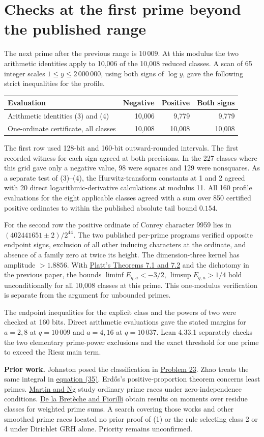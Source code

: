 \documentclass[11pt,a4paper]{article}
\newcommand{\head}[1]{\section*{\color{ink}#1}}
\begin{document}
\newpage
\head{Checks at the first prime beyond the published range}
The next prime after the previous range is \(10\,009\). At this modulus the two
arithmetic identities apply to 10,006 of the 10,008 reduced classes. A scan of
65 integer scales \(1\le y\le2\,000\,000\), using both signs of \(\log y\),
gave the following strict inequalities for the profile.
\begin{center}
\begin{tabular}{lrrr}
\hline
Evaluation & Negative & Positive & Both signs\\
\hline
Arithmetic identities (3) and (4) & 10,006 & 9,779 & 9,779\\
One-ordinate certificate, all classes & 10,008 & 10,008 & 10,008\\
\hline
\end{tabular}
\end{center}
The first row used 128-bit and 160-bit outward-rounded intervals. The first
recorded witness for each sign agreed at both precisions. In the 227 classes
where this grid gave only a negative value, 98 were squares and 129 were nonsquares.
As a separate test of (3)--(4), the Hurwitz-transform constants at 1 and 2 agreed
with 20 direct logarithmic-derivative calculations at modulus 11. All 160 profile
evaluations for the eight applicable classes agreed with a sum over 850 certified
positive ordinates to within the published absolute tail bound \(0.154\).

For the second row the positive ordinate of Conrey character 9959 lies in
\((402441651\pm2)/2^{44}\). The two published per-prime programs verified
opposite endpoint signs, exclusion of all other inducing characters at the
ordinate, and absence of a family zero at twice its height. The dimension-three
kernel has amplitude \(>1.8856\). With
\href{https://arxiv.org/pdf/1305.3087#page=14}{Platt's Theorems 7.1 and 7.2}
and the dichotomy in the previous paper, the bounds
\(\liminf E_{q,a}<-3/2\), \(\limsup E_{q,a}>1/4\) hold unconditionally for all
10,008 classes at this prime. This one-modulus verification is separate from
the argument for unbounded primes.

The endpoint inequalities for the explicit class and the powers of two were
checked at 160 bits. Direct arithmetic evaluations gave the stated margins for
\(a=2,8\) at \(q=10\,009\) and \(a=4,16\) at \(q=10\,037\).
Lean 4.33.1 separately checks the two elementary prime-power exclusions and the
exact threshold for one prime to exceed the Riesz main term.

\textbf{Prior work.} Johnston posed the classification in
\href{https://arxiv.org/pdf/2407.03530#page=9}{Problem 23}.
Zhao treats the same integral in \href{https://arxiv.org/html/2411.18903v2#S8}{equation (35)}.
Erd\H{o}s's positive-proportion theorem concerns least primes.
\href{https://arxiv.org/abs/1710.00088}{Martin and Ng} study ordinary prime races
under zero-independence conditions.
\href{https://arxiv.org/abs/2010.05944}{De la Bretèche and Fiorilli} obtain
results on moments over residue classes for weighted prime sums. A search
covering those works and other smoothed prime races located no prior proof of
(1) or the rule selecting class 2 or 4 under Dirichlet GRH alone.
Priority remains unconfirmed.
\end{document}
